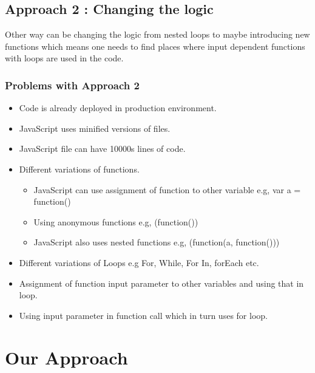 \documentclass[authoryear,preprint]{sigplanconf}
\begin{document}
\subsection{Approach 2 : Changing the logic} 
Other way can be changing the logic from nested loops to maybe introducing new functions which means one needs to find places where input dependent functions with loops are used in the code.
\subsubsection{Problems with Approach 2}
\begin{itemize}
\item Code is already deployed in production environment.
\item JavaScript uses minified versions of files.
\item JavaScript file can have 10000s lines of code.
\item Different variations of functions.
		\begin{itemize}
			\item JavaScript can use assignment of function to other variable 
				e.g, var a = function() {}
			\item Using anonymous functions
				e.g, (function())
			\item JavaScript also uses nested functions
				e.g, (function(a, function(){}))
		\end{itemize}
\item Different variations of Loops
	 e.g  For, While, For In, forEach etc.
\item Assignment of function input parameter to other variables and using that in loop.
\item Using input parameter in function call which in turn uses for loop.
	 
			
\end{itemize}

\section{Our Approach}
\end{document}
